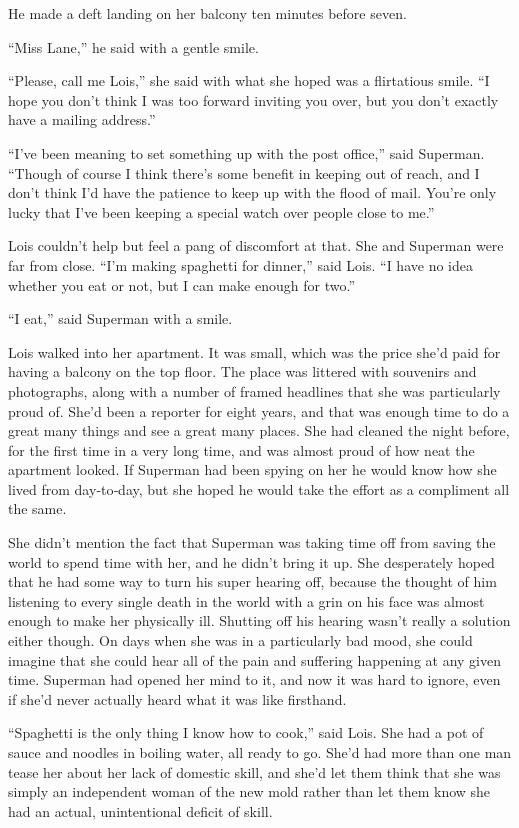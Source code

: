 \documentclass[ebook,12pt]{memoir}
\begin{document}
He made a deft landing on her balcony ten minutes before seven.

``Miss Lane,'' he said with a gentle smile.

``Please, call me Lois,'' she said with what she hoped was a flirtatious
smile. ``I hope you don't think I was too forward inviting you over, but
you don't exactly have a mailing address.''

``I've been meaning to set something up with the post office,'' said
Superman. ``Though of course I think there's some benefit in keeping out
of reach, and I don't think I'd have the patience to keep up with the
flood of mail. You're only lucky that I've been keeping a special watch
over people close to me.''

Lois couldn't help but feel a pang of discomfort at that. She and
Superman were far from close. ``I'm making spaghetti for dinner,'' said
Lois. ``I have no idea whether you eat or not, but I can make enough for
two.''

``I eat,'' said Superman with a smile.

Lois walked into her apartment. It was small, which was the price she'd
paid for having a balcony on the top floor. The place was littered with
souvenirs and photographs, along with a number of framed headlines that
she was particularly proud of. She'd been a reporter for eight years,
and that was enough time to do a great many things and see a great many
places. She had cleaned the night before, for the first time in a very
long time, and was almost proud of how neat the apartment looked. If
Superman had been spying on her he would know how she lived from
day‐to‐day, but she hoped he would take the effort as a compliment all
the same.

She didn't mention the fact that Superman was taking time off from
saving the world to spend time with her, and he didn't bring it up. She
desperately hoped that he had some way to turn his super hearing off,
because the thought of him listening to every single death in the world
with a grin on his face was almost enough to make her physically ill.
Shutting off his hearing wasn't really a solution either though. On days
when she was in a particularly bad mood, she could imagine that she
could hear all of the pain and suffering happening at any given time.
Superman had opened her mind to it, and now it was hard to ignore, even
if she'd never actually heard what it was like firsthand.

``Spaghetti is the only thing I know how to cook,'' said Lois. She had a
pot of sauce and noodles in boiling water, all ready to go. She'd had
more than one man tease her about her lack of domestic skill, and she'd
let them think that she was simply an independent woman of the new mold
rather than let them know she had an actual, unintentional deficit of
skill.
\end{document}
